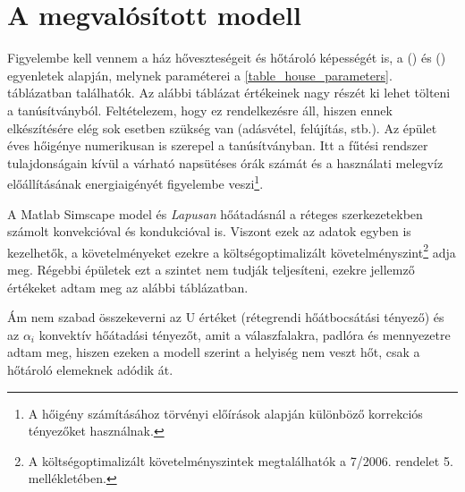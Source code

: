 \begin{table}[H]
	\footnotesize
	\centering
	\caption{Jelölések}
	
	\label{tab:Nomenclature}
\end{table}

\section{A megvalósított modell}

Figyelembe kell vennem a ház hőveszteségeit és hőtároló képességét is, a () és () egyenletek alapján, melynek paraméterei a \ref{table_house_parameters}. táblázatban találhatók.
Az alábbi táblázat értékeinek nagy részét ki lehet tölteni a tanúsítványból. Feltételezem, hogy ez rendelkezésre áll, hiszen ennek elkészítésére elég sok esetben szükség van (adásvétel, felújítás, stb.).
Az épület éves hőigénye numerikusan is szerepel a tanúsítványban. Itt a fűtési rendszer tulajdonságain kívül a várható napsütéses órák számát és a használati melegvíz előállításának energiaigényét figyelembe veszi\footnote{A hőigény számításához törvényi előírások alapján különböző korrekciós tényezőket használnak.}.

A Matlab Simscape model és \textit{Lapusan} \cite{LAPUSAN2016320}
 hőátadásnál a réteges szerkezetekben számolt konvekcióval és kondukcióval is. Viszont ezek az adatok egyben is kezelhetők, a követelményeket ezekre a költségoptimalizált követelményszint\footnote{ A  költségoptimalizált követelményszintek megtalálhatók a 7/2006. rendelet \cite{TNM2006} 5. mellékletében.} adja meg. Régebbi épületek ezt a szintet nem tudják teljesíteni, ezekre jellemző értékeket adtam meg az alábbi táblázatban. 

Ám nem szabad összekeverni az U értéket (rétegrendi hőátbocsátási tényező) és az $\alpha_i$ konvektív hőátadási tényezőt, amit a válaszfalakra, padlóra és mennyezetre adtam meg, hiszen ezeken a modell szerint a helyiség nem veszt hőt, csak a hőtároló elemeknek adódik át.

